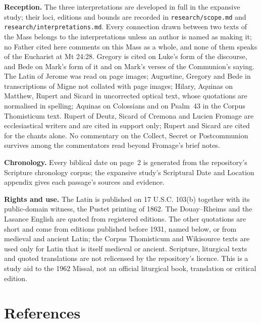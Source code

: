 {\textbf{Reception.} The three interpretations are developed in full in the
expansive study; their loci, editions and bounds are recorded in
\texttt{research/scope.md} and \texttt{research/interpretations.md}. Every
connection drawn between two texts of the Mass belongs to the interpretations
unless an author is named as making it; no Father cited here comments on this
Mass as a whole, and none of them speaks of the Eucharist at Mt 24:28. Gregory
is cited on Luke's form of the discourse, and Bede on Mark's form of it and on
Mark's verses of the Communion's saying. The Latin of Jerome was read on page
images; Augustine, Gregory and Bede in transcriptions of Migne not collated
with page images; Hilary, Aquinas on Matthew, Rupert and Sicard in
uncorrected optical text, whose quotations are normalised in spelling;
Aquinas on Colossians and on Psalm~43 in the Corpus Thomisticum text. Rupert
of Deutz, Sicard of Cremona and Lucien Fromage are ecclesiastical writers and
are cited in support only; Rupert and Sicard are cited for the chants alone.
No commentary on the Collect, Secret or Postcommunion survives among the
commentators read beyond Fromage's brief notes.

\textbf{Chronology.} Every biblical date on page~2 is generated from the
repository's Scripture chronology corpus; the expansive study's Scriptural
Date and Location appendix gives each passage's sources and evidence.

\textbf{Rights and use.} The Latin is published on 17 U.S.C. 103(b) together
with its public-domain witness, the Pustet printing of 1862. The Douay--Rheims
and the Lasance English are quoted from registered editions. The other
quotations are short and come from editions published before 1931, named
below, or from medieval and ancient Latin; the Corpus Thomisticum and
Wikisource texts are used only for Latin that is itself medieval or ancient.
Scripture, liturgical texts and quoted translations are not relicensed by the
repository's licence. This is a study aid to the 1962 Missal, not an official
liturgical book, translation or critical edition.
\par}

\section{References}

